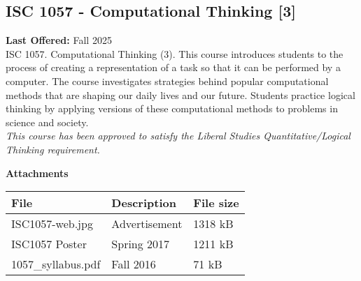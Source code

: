 \documentclass[12pt,a4paper]{article}
\begin{document}
\subsection{ISC 1057 - Computational Thinking [3]}
\textbf{Last Offered:} Fall 2025 \\
ISC 1057. Computational Thinking (3). This course introduces students to the process of creating a representation of a task so that it can be performed by a computer. The course investigates strategies behind popular computational methods that are shaping our daily lives and our future. Students practice logical thinking by applying versions of these computational methods to problems in science and society. \\
\textit{This course has been approved to satisfy the Liberal Studies Quantitative/Logical Thinking requirement.}
\begin{center}
\textbf{Attachments}
\begin{tabular}{l l l}
\hline
\textbf{File} & \textbf{Description} & \textbf{File size} \\ \hline
ISC1057-web.jpg & Advertisement & 1318 kB \\
ISC1057 Poster & Spring 2017 & 1211 kB \\
1057\_syllabus.pdf & Fall 2016 & 71 kB \\ \hline
\end{tabular}
\end{center}
\end{document}
